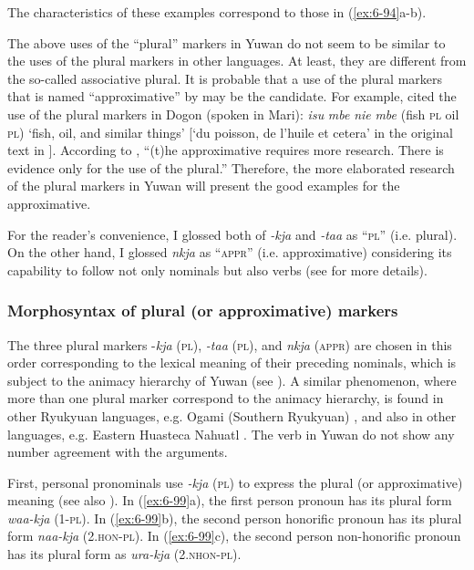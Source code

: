 The characteristics of these examples correspond to those in (\ref{ex:6-94}a-b).

  The above uses of the “plural” markers in Yuwan do not seem to be similar to the uses of the plural markers in other languages. At least, they are different from the so-called associative plural. It is probable that a use of the plural markers that is named “approximative” by \citet[239-240]{Corbett2000} may be the candidate. For example, \citet[239]{Corbett2000} cited the use of the plural markers in Dogon (spoken in Mari): \textit{isu} \textit{mbe} \textit{nie} \textit{mbe} (fish \textsc{pl} oil \textsc{pl}) ‘fish, oil, and similar things’ [‘du poisson, de l’huile et cetera’ in the original text in \citet[11]{Plungian1995}]. According to \citet[240]{Corbett2000}, “(t)he approximative requires more research. There is evidence only for the use of the plural.” Therefore, the more elaborated research of the plural markers in Yuwan will present the good examples for the approximative.

  For the reader’s convenience, I glossed both of \textit{-kja} and \textit{-taa} as “\textsc{pl}” (i.e. plural). On the other hand, I glossed \textit{nkja} as “\textsc{appr}” (i.e. approximative) considering its capability to follow not only nominals but also verbs (see  for more details).

\subsubsection{Morphosyntax of plural (or approximative) markers}

The three plural markers -\textit{kja} (\textsc{pl}), \textit{-taa} (\textsc{pl}), and \textit{nkja} (\textsc{appr}) are chosen in this order corresponding to the lexical meaning of their preceding nominals, which is subject to the animacy hierarchy of Yuwan (see ). A similar phenomenon, where more than one plural marker correspond to the animacy hierarchy, is found in other Ryukyuan languages, e.g. Ogami (Southern Ryukyuan) \citep[133]{Pellard2010}, and also in other languages, e.g. Eastern Huasteca Nahuatl \citep[77-78]{Corbett2000}. The verb in Yuwan do not show any number agreement with the arguments.

First, personal pronominals use \textit{-kja} (\textsc{pl}) to express the plural (or approximative) meaning (see also ). In (\ref{ex:6-99}a), the first person pronoun has its plural form \textit{waa-kja} (1-\textsc{pl}). In (\ref{ex:6-99}b), the second person honorific pronoun has its plural form \textit{naa-kja} (2.\textsc{hon}-\textsc{pl}). In (\ref{ex:6-99}c), the second person non-honorific pronoun has its plural form as \textit{ura-kja} (2.\textsc{nhon}-\textsc{pl}).

